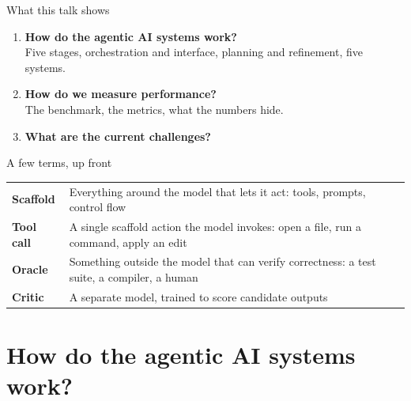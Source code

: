 \documentclass[
  aspectratio=169,
  font=times,
  sectionpage=true,
]{tumbeamer}
\begin{document}



\begin{frame}{What this talk shows}
  \begin{enumerate}
    \item \textbf{How do the agentic AI systems work?} \\
      {\small Five stages, orchestration and interface, planning and
      refinement, five systems.}
      \medskip
    \item \textbf{How do we measure performance?} \\
      {\small The benchmark, the metrics, what the numbers hide.}
      \medskip
    \item \textbf{What are the current challenges?}
  \end{enumerate}
\end{frame}

\begin{frame}{A few terms, up front}
  \begin{tabular}{@{}L{0.20\textwidth}L{0.72\textwidth}@{}}
    \toprule
    \textbf{Scaffold} & Everything around the model that lets it act: tools, prompts, control flow \\
    \addlinespace
    \textbf{Tool call} & A single scaffold action the model invokes: open a file, run a command, apply an edit \\
    \addlinespace
    \textbf{Oracle} & Something outside the model that can verify correctness: a
      test suite, a compiler, a human \\
    \addlinespace
    \textbf{Critic} & A separate model, trained to score candidate outputs \\
    \bottomrule
  \end{tabular}
\end{frame}

\section{How do the agentic AI systems work?}
\end{document}
